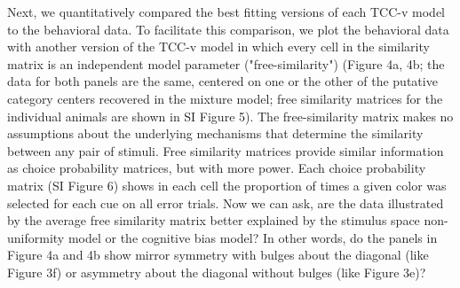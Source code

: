 Next, we quantitatively compared the best fitting versions of each TCC-v model to the behavioral data. To facilitate this comparison, we plot the behavioral data with another version of the TCC-v model in which every cell in the similarity matrix is an independent model parameter ("free-similarity") (Figure 4a, 4b; the data for both panels are the same, centered on one or the other of the putative category centers recovered in the mixture model; free similarity matrices for the individual animals are shown in SI Figure 5). The free-similarity matrix makes no assumptions about the underlying mechanisms that determine the similarity between any pair of stimuli. Free similarity matrices provide similar information as choice probability matrices, but with more power. Each choice probability matrix (SI Figure 6) shows in each cell the proportion of times a given color was selected for each cue on all error trials. Now we can ask, are the data illustrated by the average free similarity matrix better explained by the stimulus space non-uniformity model or the cognitive bias model? In other words, do the panels in Figure 4a and 4b show mirror symmetry with bulges about the diagonal (like Figure 3f) or asymmetry about the diagonal without bulges (like Figure 3e)? 

